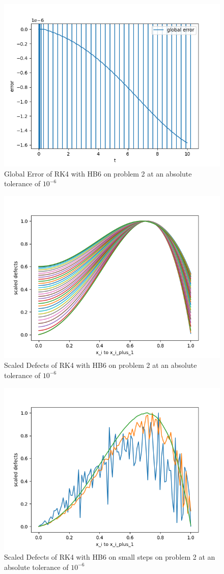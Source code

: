 \documentclass{article}
\begin{document}
\begin{figure}[H]
\centering
\includegraphics[width=0.7\linewidth]{./figures/rk4_with_hb6_p2_global_error}
\caption{Global Error of RK4 with HB6 on problem 2 at an absolute tolerance of $10^{-6}$}
\label{fig:rk4_with_hb6_p2_global_error}
\end{figure}

\begin{figure}[H]
\centering
\includegraphics[width=0.7\linewidth]{./figures/rk4_with_hb6_p2_scaled_defects}
\caption{Scaled Defects of RK4 with HB6 on problem 2 at an absolute tolerance of $10^{-6}$}
\label{fig:rk4_with_hb6_p2_scaled_defects}
\end{figure}

\begin{figure}[H]
\centering
\includegraphics[width=0.7\linewidth]{./figures/rk4_with_hb6_p2_scaled_defects_small_steps}
\caption{Scaled Defects of RK4 with HB6 on small steps on problem 2 at an absolute tolerance of $10^{-6}$}
\label{fig:rk4_with_hb6_p2_scaled_defects_small_steps}
\end{figure}
\end{document}
